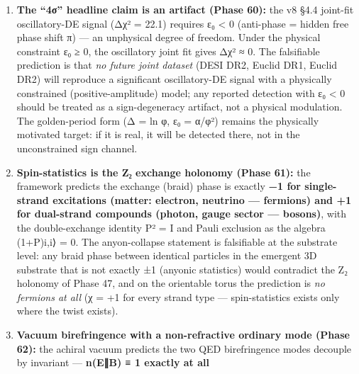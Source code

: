 \documentclass[
]{article}
\begin{document}
\begin{enumerate}
  cycles, and the amplitude anchored at ε₀ = α/φ² (a 0.28\% density
  modulation, \textasciitilde9× below current chronometer sensitivity).
  The free-period form of the same modulation is predicted to be
  \emph{indistinguishable from ΛCDM in 60-point H(z) data} (global p =
  0.62 after trial-factor accounting), so the falsifiable content lives
  at the pre-registered golden period in DESI DR1/DR2 full-shape
  structure growth (the Berti ``Stratoverso'' arena): a log-periodic
  structure-growth signal whose fitted frequency is statistically
  inconsistent with ln φ, or an H(z) modulation detected at Δ ≠ ln φ,
  would refute the golden-period dark-energy prediction.
\item
  \textbf{The ``4σ'' headline claim is an artifact (Phase 60):} the v8
  §4.4 joint-fit oscillatory-DE signal (Δχ² = 22.1) requires ε₀
  \textless{} 0 (anti-phase = hidden free phase shift π) --- an
  unphysical degree of freedom. Under the physical constraint ε₀ ≥ 0,
  the oscillatory joint fit gives Δχ² ≈ 0. The falsifiable prediction is
  that \emph{no future joint dataset} (DESI DR2, Euclid DR1, Euclid DR2)
  will reproduce a significant oscillatory-DE signal with a physically
  constrained (positive-amplitude) model; any reported detection with ε₀
  \textless{} 0 should be treated as a sign-degeneracy artifact, not a
  physical modulation. The golden-period form (Δ = ln φ, ε₀ = α/φ²)
  remains the physically motivated target: if it is real, it will be
  detected there, not in the unconstrained sign channel.
\item
  \textbf{Spin-statistics is the Z₂ exchange holonomy (Phase 61):} the
  framework predicts the exchange (braid) phase is exactly \textbf{−1
  for single-strand excitations (matter: electron, neutrino ---
  fermions) and +1 for dual-strand compounds (photon, gauge sector ---
  bosons)}, with the double-exchange identity P² = I and Pauli exclusion
  as the algebra (1+P)\textbar i,i⟩ = 0. The anyon-collapse statement is
  falsifiable at the substrate level: any braid phase between identical
  particles in the emergent 3D substrate that is not exactly ±1 (anyonic
  statistics) would contradict the Z₂ holonomy of Phase 47, and on the
  orientable torus the prediction is \emph{no fermions at all} (χ = +1
  for every strand type --- spin-statistics exists only where the twist
  exists).
\item
  \textbf{Vacuum birefringence with a non-refractive ordinary mode
  (Phase 62):} the achiral vacuum predicts the two QED birefringence
  modes decouple by invariant --- \textbf{n(E∥B) ≡ 1 exactly at all
}
\end{enumerate}
\end{document}
